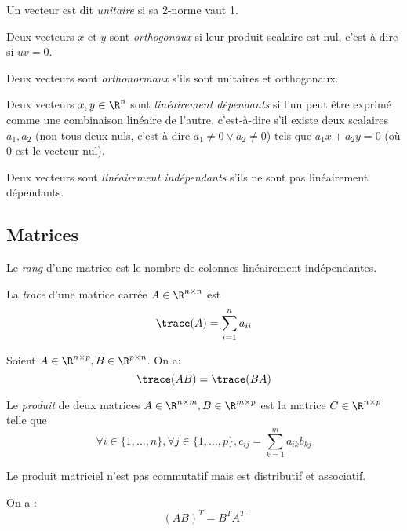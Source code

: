         \begin{definition}
            Un vecteur est dit \textit{unitaire} si sa 2-norme vaut 1.

            Deux vecteurs \(x\) et \(y\) sont \textit{orthogonaux} si leur produit scalaire est nul, c'est-à-dire si \(u v = 0\).

            Deux vecteurs sont \textit{orthonormaux} s'ils sont unitaires et orthogonaux.
        \end{definition}

        \begin{definition}
            Deux vecteurs \(x, y \in \R^n\) sont \textit{linéairement dépendants} si l'un peut être exprimé comme une combinaison linéaire de l'autre, c'est-à-dire s'il existe deux scalaires \(a_1, a_2\) (non tous deux nuls, c'est-à-dire \(a_1 \not= 0 \lor a_2 \not= 0\)) tels que \(a_1 x + a_2 y = 0\) (où \(0\) est le vecteur nul).

            Deux vecteurs sont \textit{linéairement indépendants} s'ils ne sont pas linéairement dépendants.
        \end{definition}

    \subsection{Matrices}
        \begin{definition}
            Le \textit{rang} d'une matrice est le nombre de colonnes linéairement indépendantes.
        \end{definition}

        \begin{definition}
            La \textit{trace} d'une matrice carrée \(A \in \R^{n\times n}\) est 
            \[
                \trace(A) = \sum_{i=1}^n a_{ii}
            \]
        \end{definition}

        \begin{propriete}
            Soient \(A \in \R^{n \times p}, B \in \R^{p\times n}\). On a:
            \[
                \trace(AB) = \trace(BA)
            \]
        \end{propriete}

        \begin{definition}
            Le \textit{produit} de deux matrices \(A \in \R^{n \times m}, B \in \R^{m \times p}\) est la matrice \(C \in \R^{n \times p}\) telle que
            \[
                \forall i \in \{1, \dots, n\}, \forall j \in \{1, \dots, p\}, c_{ij} = \sum_{k=1}^m a_{ik} b_{kj}
            \]

            Le produit matriciel n'est pas commutatif mais est distributif et associatif.

            On a :
            \[
                (AB)^T = B^T A^T
            \]
        \end{definition}
        
